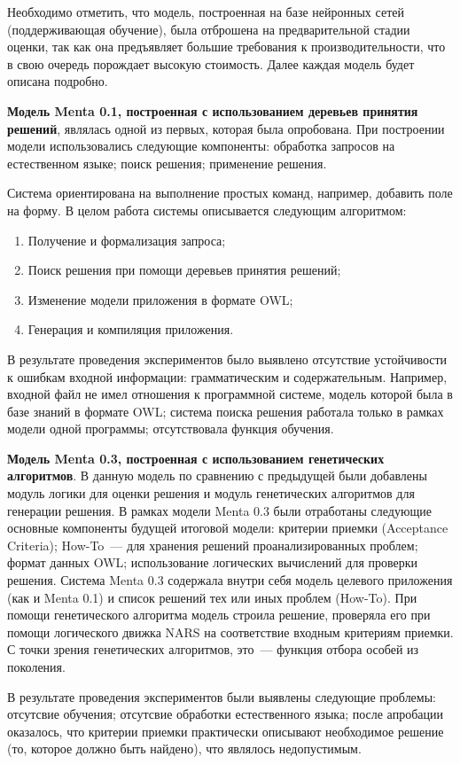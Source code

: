 Необходимо отметить, что модель, построенная на базе нейронных сетей (поддерживающая обучение), была отброшена на предварительной стадии оценки, так как она предъявляет большие требования к производительности, что в свою очередь порождает высокую стоимость. Далее каждая модель будет описана подробно.

\textbf{Модель Menta 0.1, построенная с использованием деревьев принятия решений}, являлась одной из первых, которая была опробована. При построении модели использовались следующие компоненты: обработка запросов на естественном языке; поиск решения; применение решения. \par
Система ориентирована на выполнение простых команд, например, добавить поле на форму. В целом работа системы описывается следующим алгоритмом:
\begin{enumerate}
	\item Получение и формализация запроса;
	\item Поиск решения при помощи деревьев принятия решений;
	\item Изменение модели приложения в формате OWL;
	\item Генерация и компиляция приложения.
\end{enumerate} \par
В результате проведения экспериментов было выявлено отсутствие устойчивости к ошибкам входной информации: грамматическим и содержательным. Например, входной файл не имел отношения к программной системе, модель которой была в базе знаний в формате OWL; система поиска решения работала только в рамках модели одной программы;  отсутствовала функция обучения. \par



\textbf{Модель Menta 0.3, построенная с использованием генетических алгоритмов}.
В данную модель по сравнению с предыдущей были добавлены модуль логики для оценки решения и модуль генетических алгоритмов для генерации решения. В рамках модели Menta 0.3 были отработаны следующие основные компоненты будущей итоговой модели: критерии приемки (Acceptance Criteria); How-To~--- для хранения решений проанализированных проблем; формат данных OWL; использование логических вычислений для проверки решения. Система Menta 0.3 содержала внутри себя модель целевого приложения (как и Menta 0.1) и список решений тех или иных проблем (How-To). При помощи генетического алгоритма модель строила решение, проверяла его при помощи логического движка NARS на соответствие входным критериям приемки. С точки зрения генетических алгоритмов, это~--- функция отбора особей из поколения.  \par
В результате проведения экспериментов были выявлены следующие проблемы: отсутсвие обучения; отсутсвие обработки естественного языка; после апробации оказалось, что критерии приемки практически описывают необходимое решение (то, которое должно быть найдено), что являлось недопустимым. \par


